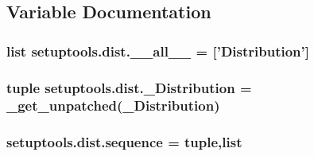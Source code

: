 \subsection{Variable Documentation}
\hypertarget{namespacesetuptools_1_1dist_a330aa0a5773145da29fcc29112d8d5d6}{}
\subsubsection[{\+\_\+\+\_\+all\+\_\+\+\_\+}]{\setlength{\rightskip}{0pt plus 5cm}list setuptools.\+dist.\+\_\+\+\_\+all\+\_\+\+\_\+ = \mbox{[}'{\bf Distribution}'\mbox{]}}\label{namespacesetuptools_1_1dist_a330aa0a5773145da29fcc29112d8d5d6}
\hypertarget{namespacesetuptools_1_1dist_a9d7c83dcfb4d6bcec9c662e4523053bd}{}
\subsubsection[{\+\_\+\+Distribution}]{\setlength{\rightskip}{0pt plus 5cm}tuple setuptools.\+dist.\+\_\+\+Distribution = \+\_\+get\+\_\+unpatched(\+\_\+\+Distribution)}\label{namespacesetuptools_1_1dist_a9d7c83dcfb4d6bcec9c662e4523053bd}
\hypertarget{namespacesetuptools_1_1dist_a990181c5330d133fd66d47c179a9395b}{}
\subsubsection[{sequence}]{\setlength{\rightskip}{0pt plus 5cm}setuptools.\+dist.\+sequence = tuple,list}\label{namespacesetuptools_1_1dist_a990181c5330d133fd66d47c179a9395b}

